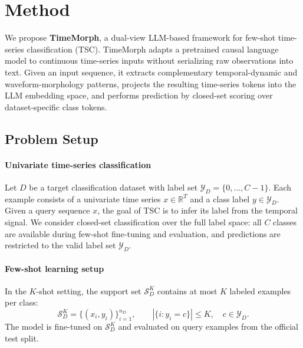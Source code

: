 \documentclass[10pt,journal,compsoc]{IEEEtran}
\begin{document}
\section{Method}
\label{sec:method}

We propose \textbf{TimeMorph}, a dual-view LLM-based framework for few-shot time-series classification (TSC).
TimeMorph adapts a pretrained causal language model to continuous time-series inputs without serializing raw observations into text.
Given an input sequence, it extracts complementary temporal-dynamic and waveform-morphology patterns, projects the resulting time-series tokens into the LLM embedding space, and performs prediction by closed-set scoring over dataset-specific class tokens.

\subsection{Problem Setup}
\label{sec:problem-formulation}

\paragraph{Univariate time-series classification}
Let $D$ be a target classification dataset with label set
$\mathcal{Y}_D=\{0,\ldots,C-1\}$.
Each example consists of a univariate time series $x\in\mathbb{R}^{T}$ and a class label $y\in\mathcal{Y}_D$.
Given a query sequence $x$, the goal of TSC is to infer its label from the temporal signal.
We consider closed-set classification over the full label space: all $C$ classes are available during few-shot fine-tuning and evaluation, and predictions are restricted to the valid label set $\mathcal{Y}_D$.

\paragraph{Few-shot learning setup}
In the $K$-shot setting, the support set
$\mathcal{S}_D^{K}$ contains at most $K$ labeled examples per class:
\begin{equation}
\label{eq:k-shot-support}
\mathcal{S}_D^{K}
=
\{(x_i,y_i)\}_{i=1}^{n_D},
\qquad
|\{i:y_i=c\}|\le K,\quad c\in\mathcal{Y}_D .
\end{equation}
The model is fine-tuned on $\mathcal{S}_D^{K}$ and evaluated on query examples from the official test split.
\end{document}
